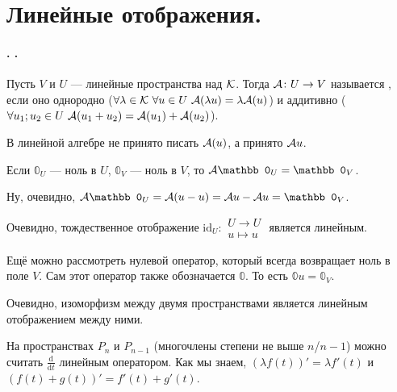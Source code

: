 \documentclass{article}
\begin{document}
    \section{Линейные отображения.}
    \paragraph{. .}
    \begin{itemize}
        \dfn Пусть $V$ и $U$ --- линейные пространства над ${\mathcal{K}}$. Тогда ${\mathcal{A}}\colon U\to V$ называется , если оно однородно ($\forall\lambda\in{\mathcal{K}}~\forall u\in U~{\mathcal{A}}(\lambda u)=\lambda{\mathcal{A}}(u)$) и аддитивно ($\forall u_1;u_2\in U~{\mathcal{A}}(u_1+u_2)={\mathcal{A}}(u_1)+{\mathcal{A}}(u_2)$).
        \begin{Comment}
            В линейной алгебре не принято писать ${\mathcal{A}}(u)$, а принято ${\mathcal{A}} u$.
        \end{Comment}
        \thm Если $\mathbb0_U$ --- ноль в $U$, $\mathbb0_V$ --- ноль в $V$, то $\scriptA\mathbb0_U=\mathbb0_V$.
        \begin{Proof}
            Ну, очевидно, $\scriptA\mathbb0_U=\scriptA(u-u)=\scriptA u-\scriptA u=\mathbb0_V$.
        \end{Proof}
        \begin{Example}
            Очевидно, тождественное отображение $\mathrm{id}_U\colon\substack{U\to U\\u\mapsto u}$ является линейным.
        \end{Example}
        \begin{Example}
            Ещё можно рассмотреть нулевой оператор, который всегда возвращает ноль в поле $V$. Сам этот оператор также обозначается $\mathbb0$. То есть $\mathbb0u=\mathbb0_V$.
        \end{Example}
        \begin{Example}
            Очевидно, изоморфизм между двумя пространствами является линейным отображением между ними.
        \end{Example}
        \begin{Example}
            На пространствах $P_n$ и $P_{n-1}$ (многочлены степени не выше $n$/$n-1$) можно считать $\frac{\mathrm d}{\mathrm dt}$ линейным оператором. Как мы знаем, $(\lambda f(t))'=\lambda f'(t)$ и $(f(t)+g(t))'=f'(t)+g'(t)$.
        \end{Example}

\end{itemize}
\end{document}
